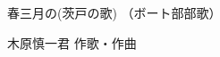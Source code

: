 \documentclass[10pt,b5j]{tarticle} %
\begin{document}
\begin{minipage}[c]{0.7\hsize} %
    \begin{center}
        {\LARGE
            春三月の(茨戸の歌) %
        }
        {\small 
            （ボート部部歌） %
        }
    \end{center}
\end{minipage}
\begin{minipage}[c]{0.3\hsize} %
    \begin{flushright} %
        木原慎一君 作歌・作曲 %
    \end{flushright}
\end{minipage}
\end{document}
